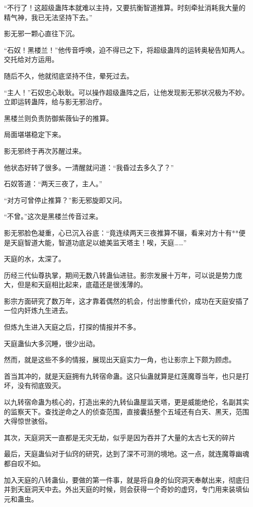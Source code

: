 \begin{this_body}
“不行了！这超级蛊阵本就难以主持，又要抗衡智道推算。时刻牵扯消耗我大量的精气神，我已无法坚持下去。”

影无邪一颗心直往下沉。

“石奴！黑楼兰！”他传音呼唤，迫不得已之下，将超级蛊阵的运转奥秘告知两人。交托给对方运用。

随后不久，他就彻底坚持不住，晕死过去。

“主人！”石奴忠心耿耿。可以操作超级蛊阵之后，让他发现影无邪状况极为不妙。立即运转蛊阵，给与影无邪治疗。

黑楼兰则负责防御紫薇仙子的推算。

局面堪堪稳定下来。

影无邪终于再次苏醒过来。

他状态好转了很多。一清醒就问道：“我昏过去多久了？”

石奴答道：“两天三夜了，主人。”

“对方可曾停止推算？”影无邪旋即又问。

“不曾。”这次是黑楼兰传音过来。

影无邪脸色凝重，心已沉入谷底：“竟连续两天三夜推算不辍，看来对方十有**便是天庭智道大能，智道功底足以媲美监天塔主！唉，天庭……”

天庭的水，太深了。

历经三代仙尊执掌，期间无数八转蛊仙进驻。影宗发展十万年，可以说是势力庞大，但是和天庭相比起来，底蕴还是很浅薄的。

影宗方面研究了数万年，这才靠着偶然的机会，付出惨重代价，成功在天庭安插了一位内奸炼九生进去。

但炼九生进入天庭之后，打探的情报并不多。

天庭蛊仙大多沉睡，很少出动。

然而，就是这些不多的情报，展现出天庭实力一角，也让影宗上下颇为顾虑。

首当其冲的，就是天庭拥有九转宿命蛊。这只仙蛊就算是红莲魔尊当年，也只是打坏，没有彻底毁灭。

以九转宿命蛊为核心的，打造出来的九转仙蛊屋监天塔，更是威能绝伦，名副其实的监察天下。查找逆命之人的侦查范围，直接囊括整个五域还有白天、黑天，范围大得惊世骇俗。

其次，天庭洞天一直都是无灾无劫，似乎是因为吞并了大量的太古七天的碎片

最后，天庭蛊仙对于仙窍的研究，达到了深不可测的境地。这一点，就连魔尊幽魂都自叹不如。

加入天庭的八转蛊仙，要做的第一件事，就是将自身的仙窍洞天奉献出来，彻底归并到天庭洞天中去。外出天庭的时候，则会获得一个奇妙的虚窍，专门用来装填仙元和蛊虫。


\end{this_body}

